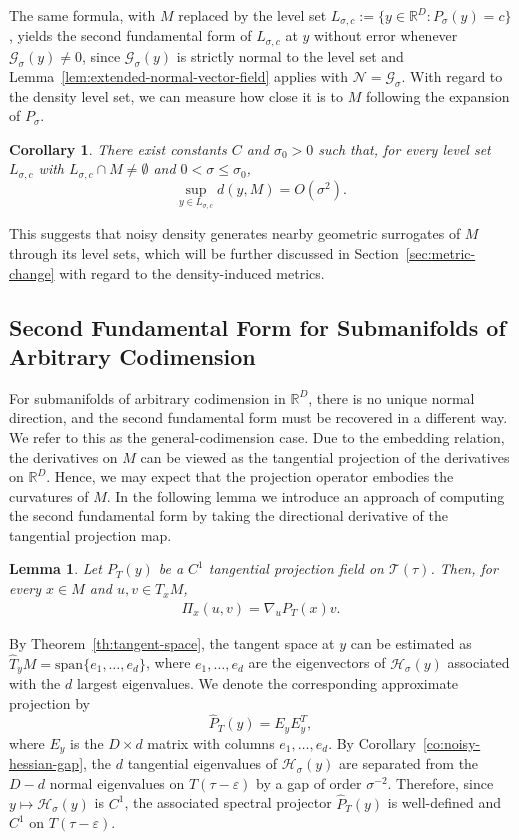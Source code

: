 \documentclass[11pt]{article}
\theoremstyle{plain}
\newtheorem{lemma}[theorem]{Lemma}
\newtheorem{corollary}[theorem]{Corollary}
\theoremstyle{definition}
\begin{document}
The same formula, with $M$ replaced by the level set $L_{\sigma,c}:=\{y\in\mathbb R^D: P_\sigma(y)=c\}$, yields the second fundamental form of $L_{\sigma,c}$ at $y$ without error whenever $\mathcal G_\sigma(y)\neq 0$, since $\mathcal G_\sigma(y)$ is strictly normal to the level set and Lemma~\ref{lem:extended-normal-vector-field} applies with $\mathcal N = \mathcal G_\sigma$. With regard to the density level set, we can measure how close it is to $M$ following the expansion of $P_\sigma$.
\begin{corollary}\label{co:level-set}
    There exist constants $C$ and $\sigma_0>0$ such that, for every level set $L_{\sigma,c}$ with $L_{\sigma,c}\cap M\neq\emptyset$ and $0<\sigma\le\sigma_0$,
    \[
    \sup_{y\in L_{\sigma,c}} d(y,M)=O(\sigma^2).
    \]
\end{corollary}
This suggests that noisy density generates nearby geometric surrogates of $M$ through its level sets, which will be further discussed in Section~\ref{sec:metric-change} with regard to the density-induced metrics.

\subsection{Second Fundamental Form for Submanifolds of Arbitrary Codimension}\label{sec:Pi-codimension}
For submanifolds of arbitrary codimension in $\mathbb{R}^D$, there is no unique normal direction, and the second fundamental form must be recovered in a different way. We refer to this as the general-codimension case. Due to the embedding relation, the derivatives on $M$ can be viewed as the tangential projection of the derivatives on $\mathbb{R}^D$. Hence, we may expect that the projection operator embodies the curvatures of $M$. In the following lemma we introduce an approach of computing the second fundamental form by taking the directional derivative of the tangential projection map.
\begin{lemma}\label{lem:second-fundamental-form-general}
    Let $P_T(y)$ be a $C^1$ tangential projection field on $\mathcal T(\tau)$. Then, for every $x\in M$ and $u,v\in T_xM$,
    \begin{align}
        \Pi_x(u,v) = \nabla_uP_T(x) v.
    \end{align}
\end{lemma}
By Theorem~\ref{th:tangent-space}, the tangent space at $y$ can be estimated as $\widehat{T}_yM = \mathrm{span}\{e_1,\dots,e_d\}$, where $e_1,\dots,e_d$ are the eigenvectors of $\mathcal{H}_\sigma(y)$ associated with the $d$ largest eigenvalues. We denote the corresponding approximate projection by
\[
\widehat{P}_T(y)= E_yE_y^T,
\]
where $E_y$ is the $D\times d$ matrix with columns $e_1,\dots,e_d$. By Corollary~\ref{co:noisy-hessian-gap}, the $d$ tangential eigenvalues of $\mathcal H_\sigma(y)$ are separated from the $D-d$ normal eigenvalues on $T(\tau-\varepsilon)$ by a gap of order $\sigma^{-2}$. Therefore, since $y \mapsto \mathcal H_\sigma(y)$ is $C^1$, the associated spectral projector $\widehat P_T(y)$ is well-defined and $C^1$ on $T(\tau-\varepsilon)$.
\end{document}
